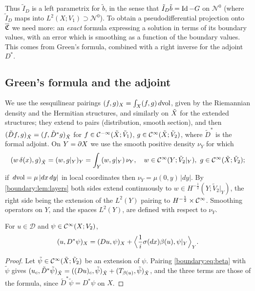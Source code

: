 Thus $\tilde I_D$ is a left parametrix for $\tilde b$, in the sense that $\tilde I_D
\tilde b=\operatorname{Id}-G$ on $\mathcal{N}^0$ (where $\tilde I_D$ maps into $L^2(X;V_1)\supset
\mathcal{N}^0$). To obtain a pseudodifferential projection onto $\overline{\mathfrak{C}}$ we
need more: an \emph{exact} formula expressing a solution in terms of its boundary
values, with an error which is smoothing as a function of the boundary values. This
comes from Green's formula, combined with a right inverse for the adjoint $D^*$.

\subsection*{Green's formula and the adjoint}
We use the sesquilinear pairings $( f, g)_X=\int_X(f,g)\,d\mathrm{vol}$, given by the
Riemannian density and the Hermitian structures, and similarly on $\tilde{X}$ for the
extended structures; they extend to pairs (distribution, smooth section), and then
$( \tilde Df, g)_{\tilde{X}}=( f, \tilde D^*g)_{\tilde{X}}$ for $f\in\mathcal{C}^{-\infty}(\tilde{X};\tilde V_1)$,
$g\in\mathcal{C}^\infty(\tilde{X};\tilde V_2)$, where $\tilde D^*$ is the formal adjoint. On $Y=\partial X$ we
use the smooth positive density $\nu_Y$ for which
\begin{equation*}
( w\,\delta(x), g)_{\tilde{X}}=( w, g|_Y)_Y=\int_Y(w,g|_Y)\,\nu_Y,\quad
w\in\mathcal{C}^\infty(Y;\tilde V_2|_Y),\ g\in\mathcal{C}^\infty(\tilde{X};\tilde V_2);
\end{equation*}
if $\,d\mathrm{vol}=\mu\,|dx\,dy|$ in local coordinates then $\nu_Y=\mu(0,y)\,|dy|$. By
\cref{boundary:lem:layers} both sides extend continuously to $w\in H^{-\frac12}
(Y;\tilde V_2|_Y)$, the right side being the extension of the $L^2(Y)$ pairing to
$H^{-\frac12}\times\mathcal{C}^\infty$. Smoothing operators on $Y$, and the spaces $L^2(Y)$, are
defined with respect to $\nu_Y$.

\begin{lemma}\label{boundary:lem:green}
For $u\in\mathcal{D}$ and $\psi\in\mathcal{C}^\infty(X;V_2)$,
\begin{equation*}
( u, D^*\psi)_X=( Du, \psi)_X+\Big\langle\frac1i\sigma(dx)\beta(u),
\psi|_Y\Big\rangle_Y.
\end{equation*}
\end{lemma}
\begin{proof}
Let $\tilde\psi\in\mathcal{C}^\infty(\tilde{X};\tilde V_2)$ be an extension of $\psi$. Pairing
\eqref{boundary:eq:beta} with $\tilde\psi$ gives $( u_c, \tilde D^*\tilde\psi)_{\tilde{X}}=( (Du)_c, \tilde
\psi)_{\tilde{X}}+( T_{\beta(u)}, \tilde\psi)_{\tilde{X}}$, and the three terms are those of the
formula, since $\tilde D^*\tilde\psi=D^*\psi$ on $X$.
\end{proof}

